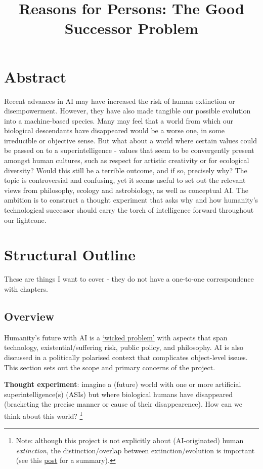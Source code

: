 \documentclass{article}
\title{Reasons for Persons: The Good Successor Problem}
\begin{document}
\maketitle
\section{Abstract}

Recent advances in AI may have increased the risk of human extinction or disempowerment. However, they have also made tangible our possible evolution into a machine-based species.  Many may feel that a world from which our biological descendants have disappeared would be a worse one, in some irreducible or objective sense.  But what about a world where certain values could be passed on to a superintelligence - values that seem to be convergently present amongst human cultures, such as respect for artistic creativity or for ecological diversity?  Would this still be a terrible outcome, and if so, precisely why?  The topic is controversial and confusing, yet it seems useful to set out the relevant views from philosophy, ecology and astrobiology, as well as conceptual AI. The ambition is to construct a thought experiment that asks why and how humanity's technological successor should carry the torch of intelligence forward throughout our lightcone.

\section{Structural Outline}

These are things I want to cover - they do not have a one-to-one correspondence with chapters.

\subsection{Overview}

Humanity's future with AI is a \href{https://en.wikipedia.org/wiki/Wicked_problem}{`wicked problem'} with aspects that span technology, existential/suffering risk, public policy, and philosophy.  AI is also discussed in a politically polarised context that complicates object-level issues.  This section sets out the scope and primary concerns of the project.

\textbf{Thought experiment}: imagine a (future) world with one or more artificial superintelligence(s) (ASIs) but where biological humans have disappeared (bracketing the precise manner or cause of their disappearence).  How can we think about this world? \footnote{Note: although this project is not explicitly about (AI-originated) human \textit{extinction}, the distinction/overlap between extinction/evolution is important (see this \href{https://www.lesswrong.com/posts/HaGTQcxqjHPyR9Ju6/unpicking-extinction}{post} for a summary). }
\end{document}
